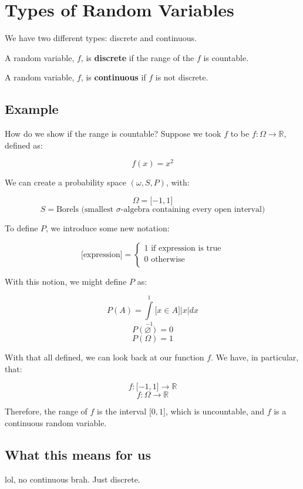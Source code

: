 \documentclass{article}
\begin{document}
\section*{Types of Random Variables}

We have two different types: discrete and continuous.

A random variable, $f$, is \textbf{discrete} if the range of the $f$
is countable.

A random variable, $f$, is \textbf{continuous} if $f$ is not discrete.

\subsection*{Example}

How do we show if the range is countable? Suppose we took $f$ to be
$f:\Omega\rightarrow\mathbb{R}$, defined as:

\[
f(x)=x^2
\]

We can create a probability space $(\omega,S,P)$, with:

\[
\Omega=\lbrack -1, 1\rbrack
\] \[
S=\text{Borels (smallest $\sigma$-algebra containing every open interval)}
\]

To define $P$, we introduce some new notation:

\[
\lbrack\text{expression}\rbrack=\begin{cases}
1\text{ if expression is true} \\
0\text{ otherwise} \\
\end{cases}
\]

With this notion, we might define $P$ as:

\[
P(A)=\int\limits_{-1}^1\lbrack x\in A\rbrack |x| dx
\] \[
P(\varnothing)=0
\] \[
P(\Omega)=1
\]

With that all defined, we can look back at our function $f$. We have,
in particular, that:

\[
f:\lbrack-1,1\rbrack\rightarrow\mathbb{R}
\] \[
f:\Omega\rightarrow\mathbb{R}
\]

Therefore, the range of $f$ is the interval $\lbrack{}0,1\rbrack$,
which is uncountable, and $f$ is a continuous random variable.

\subsection*{What this means for us}

lol, no continuous brah. Just discrete.
\end{document}
